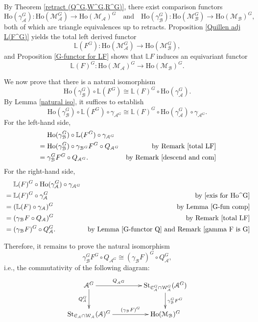 \documentclass[12pt,twoside]{amsart}
\theoremstyle{bfupright head,slanted body}
\theoremstyle{bfupright head,upright body}
\theoremstyle{fixed bf head,slanted body}
\theoremstyle{fixed bf head,upright body}
\theoremstyle{numbered paragraph}
\newenvironment{prf*}[1][Proof]{%
  \begin{proof}[\bf #1]
    \setcounter{equation}{0}
    \renewcommand{\theequation}{\arabic{equation}}}
  {\end{proof}
}
\numberwithin{equation}{res}
\newcommand{\calC}{\mathcal{C}}
\newcommand{\calW}{\mathcal{W}}
\newcommand{\calA}{\mathcal{A}}
\newcommand{\calB}{\mathcal{B}}
\newcommand{\calM}{\mathcal{M}}
\newcommand{\Ho}{\mathrm{Ho}}
\newcommand{\St}{\mathrm{St}}
\begin{document}
\begin{prf*} \label{PROOF OF B}
By Theorem \ref{retract (Q^G,W^G,R^G)}, there exist comparison functors
\[
\Ho(\gamma_{\calA}^G): \Ho(\calM_\calA^G) \to \Ho(\calM_\calA)^G
\quad\text{and}\quad
\Ho(\gamma_\calB^G): \Ho(\calM_\calB^G) \to \Ho(\calM_\calB)^G,
\]
both of which are triangle equivalences up to retracts.
Proposition \ref{Quillen adj L(F^G)} yields the total left derived functor
\[
\mathbb{L}(F^G) : \Ho(\calM_\calA^G) \to \Ho(\calM_\calB^G),
\]
and Proposition \ref{G-functor for LF} shows that $\mathbb{L}F$ induces an equivariant functor
\[
\mathbb{L}(F)^G : \Ho(\calM_\calA)^G \to \Ho(\calM_\calB)^G.
\]

We now prove that there is a natural isomorphism
\[
\Ho(\gamma_\calB^G) \circ \mathbb{L}(F^G) \cong \mathbb{L}(F)^G \circ \Ho(\gamma_{\calA}^G).
\]
By Lemma \ref{natural iso}, it suffices to establish
\[
      \Ho(\gamma_\calB^G) \circ \mathbb{L}(F^G) \circ \gamma_{\calA^G}
\cong \mathbb{L}(F)^G \circ \Ho(\gamma_{\calA}^G) \circ \gamma_{\calA^G}.
\]
For the left-hand side,
\begin{align*}
& \phantom{\quad \,\,}  \Ho(\gamma_\calB^G) \circ \mathbb{L}(F^G) \circ \gamma_{\calA^G}   \\
& =  \Ho(\gamma_\calB^G) \circ \gamma_{\calB^G} F^G \circ Q_{\calA^G}
& \text{by Remark } \ref{total LF}                                                         \\
& =  \gamma_\calB^G F^G \circ Q_{\calA^G}.
& \text{by Remark } \ref{descend and com}
\end{align*}
For the right-hand side,
\begin{align*}
& \phantom{\quad \,\,}  \mathbb{L}(F)^G \circ \Ho(\gamma_{\calA}^G) \circ \gamma_{\calA^G}      \\
& =  \mathbb{L}(F)^G \circ \gamma_{\calA}^G
& \text{by } \ref{exis for Ho^G}                                                            \\
& =  (\mathbb{L}(F) \circ \gamma_{\calA})^G
& \text{by Lemma } \ref{G-fun comp}                                                        \\
& =  (\gamma_\calB F \circ Q_\calA)^G
& \text{by Remark } \ref{total LF}                                                            \\
& =  (\gamma_\calB F)^G \circ Q_\calA^G.
& \text{by Lemma } \ref{G-functor Q} \text{ and Remark } \ref{gamma F is G}
\end{align*}

Therefore, it remains to prove the natural isomorphism
\[
\gamma_\calB^G F^G \circ Q_{\calA^G} \cong (\gamma_\calB F)^G \circ Q_\calA^G,
\]
i.e., the commutativity of the following diagram:
\[
\xymatrix@C=1.5CM{
   \calA^G
\ar[d]_-{Q_\calA^G}
\ar[r]^-{Q_{\calA^G}}
&  \St_{\calC_\calA^G \cap \calW_\calA^G}(\calA^G)
\ar[d]^-{\gamma_\calB^G F^G}               \\
   \St_{\calC_\calA \cap \calW_\calA}(\calA)^G
\ar[r]^-{(\gamma_\calB F)^G}
&  \Ho(\calM_\calB)^G                                                                         }
\]


\end{prf*}
\end{document}
